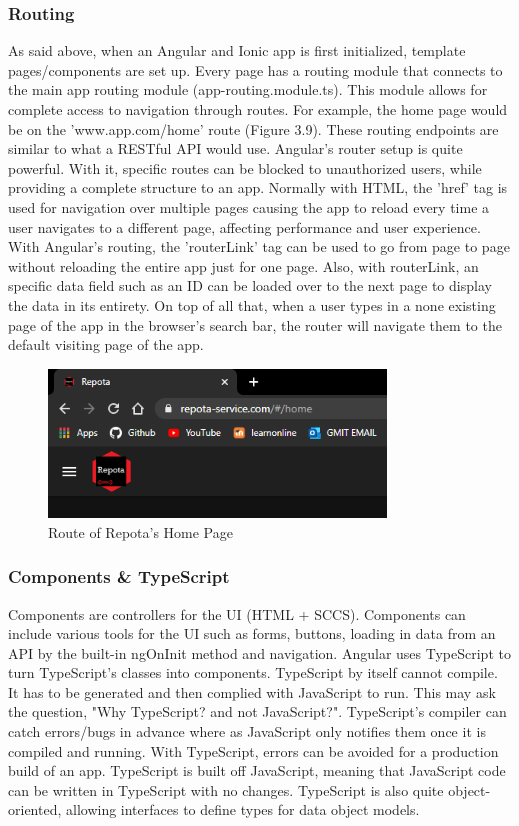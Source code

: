 \subsubsection{Routing}
As said above, when an Angular and Ionic app is first initialized, template pages/components are set up. Every page has a routing module that connects to the main app routing module (app-routing.module.ts). This module allows for complete access to navigation through routes. For example, the home page would be on the 'www.app.com/home' route (Figure 3.9). These routing endpoints are similar to what a RESTful API would use. Angular's router setup is quite powerful. With it, specific routes can be blocked to unauthorized users, while providing a complete structure to an app. Normally with HTML, the 'href' tag is used for navigation over multiple pages causing the app to reload every time a user navigates to a different page, affecting performance and user experience. With Angular's routing, the 'routerLink' tag can be used to go from page to page without reloading the entire app just for one page. Also, with routerLink, an specific data field such as an ID can be loaded over to the next page to display the data in its entirety. On top of all that, when a user types in a none existing page of the app in the browser's search bar, the router will navigate them to the default visiting page of the app. \cite{ref15}

\begin{figure}[H]
    \caption{Route of Repota's Home Page}
    \label{image:homeRoute}
    \centering
    \includegraphics[width=0.8\textwidth]{images/misc/home-route.png}
\end{figure}

\subsubsection{Components \& TypeScript}
Components are controllers for the UI (HTML + SCCS). Components can include various tools for the UI such as forms, buttons, loading in data from an API by the built-in ngOnInit method and navigation. Angular uses TypeScript to turn TypeScript's classes into components. TypeScript by itself cannot compile. It has to be generated and then complied with JavaScript to run. This may ask the question, "Why TypeScript? and not JavaScript?". TypeScript's compiler can catch errors/bugs in advance where as JavaScript only notifies them once it is compiled and running. With TypeScript, errors can be avoided for a production build of an app. TypeScript is built off JavaScript, meaning that JavaScript code can be written in TypeScript with no changes. TypeScript is also quite object-oriented, allowing interfaces to define types for data object models. \cite{ref16}

